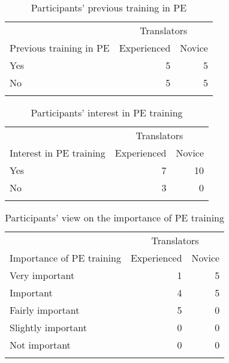 \documentclass[output=paper]{langscibook}
\begin{document}
\begin{table}
\caption{Participants’ previous training in PE}
\label{tab:1:Participants’ previous training in PE}
 \begin{tabularx}{.75\textwidth}{Xrr}
  \lsptoprule
                            & \multicolumn{2}{c}{Translators}\\\cmidrule(lr){2-3}
   Previous training in PE  & Experienced & Novice\\            
  \midrule
  Yes & 5 & 5 \\
  No & 5 & 5\\
  \lspbottomrule
 \end{tabularx}
\end{table}

\begin{table}
\caption{Participants’ interest in PE training}
\label{tab:1:Participants’ interest in PE training}
  \begin{tabularx}{.75\textwidth}{Xrr}
  \lsptoprule
                           & \multicolumn{2}{c}{Translators}\\\cmidrule(lr){2-3}
  Interest in PE training  & Experienced & Novice\\            
  \midrule
  Yes & 7 & 10 \\
  No & 3 & 0 \\
  \lspbottomrule
 \end{tabularx}
\end{table}


\begin{table}
\caption{Participants’ view on the importance of PE training}
\label{tab:1:Participants’ view on the importance of PE training}
 \begin{tabularx}{.75\textwidth}{Xrr}
  \lsptoprule
                             & \multicolumn{2}{c}{Translators}\\\cmidrule(lr){2-3}
  Importance of PE training  & Experienced & Novice\\             
  \midrule
  Very important & 1 & 5  \\
  Important & 4 & 5\\
  Fairly important & 5 & 0\\
  Slightly important   & 0 & 0\\
  Not important   & 0 & 0\\
  \lspbottomrule
 \end{tabularx}
\end{table}
\end{document}
